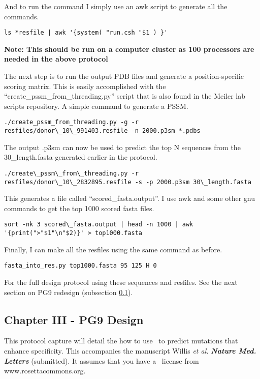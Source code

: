 And to run the command I simply use an awk script to generate all the commands.

\begin{lstlisting}[breaklines=true]
ls *resfile | awk '{system( "run.csh "$1 ) }'
\end{lstlisting}

\textbf{Note: This should be run on a computer cluster as 100 processors are needed in the above protocol}

The next step is to run the output PDB files and generate a position-specific scoring matrix. This is easily accomplished with the ``create\_pssm\_from\_threading.py'' script that is also found in the Meiler lab scripts repository. A simple command to generate a PSSM.

\begin{lstlisting}[breaklines=true]
./create_pssm_from_threading.py -g -r resfiles/donor\_10\_991403.resfile -n 2000.p3sm *.pdbs
\end{lstlisting}

The output .p3sm can now be used to predict the top N sequences from the 30\_length.fasta generated earlier in the protocol.

\begin{lstlisting}[breaklines=true]
./create\_pssm\_from\_threading.py -r resfiles/donor\_10\_2832895.resfile -s -p 2000.p3sm 30\_length.fasta
\end{lstlisting}

This generates a file called ``scored\_fasta.output''. I use awk and some other gnu commands to get the top 1000 scored fasta files.

\begin{lstlisting}[breaklines=true]
sort -nk 3 scored\_fasta.output | head -n 1000 | awk '{print(">"$1"\n"$2)}' > top1000.fasta
\end{lstlisting}

Finally, I can make all the resfiles using the same command as before.

\begin{lstlisting}[breaklines=true]
fasta_into_res.py top1000.fasta 95 125 H 0
\end{lstlisting}

For the full design protocol using these sequences and resfiles. See the next section on PG9 redesign (subsection \ref{subsec:pg9redesign}).

\subsection{Chapter III - PG9 Design}
\label{subsec:pg9redesign}
\setlength{\parindent}{0cm}
This protocol capture will detail the how to use \rosettadesign~to predict mutations that enhance specificity. This accompanies the manuscript Willis \textit{et al.} \textbf{\textit{Nature Med. Letters}} (submitted). It assumes that you have a \rosetta~license from www.rosettacommons.org. \\

